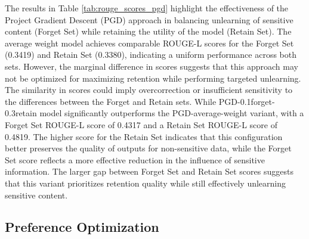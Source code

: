 \documentclass[11pt]{article}
\begin{document}
    \begin{table}[h!]
        \centering
        \caption{Average ROUGE-L Scores for Forget and Retain Sets}
        \label{tab:rouge_scores_pgd}
    \end{table}

    The results in Table \ref{tab:rouge_scores_pgd} highlight the effectiveness of the Project Gradient Descent (PGD) approach in balancing unlearning of sensitive content (Forget Set) while retaining the utility of the model (Retain Set). The average weight model achieves comparable ROUGE-L scores for the Forget Set (0.3419) and Retain Set (0.3380), indicating a uniform performance across both sets. However, the marginal difference in scores suggests that this approach may not be optimized for maximizing retention while performing targeted unlearning. The similarity in scores could imply overcorrection or insufficient sensitivity to the differences between the Forget and Retain sets. While PGD-0.1forget-0.3retain model significantly outperforms the PGD-average-weight variant, with a Forget Set ROUGE-L score of 0.4317 and a Retain Set ROUGE-L score of 0.4819. The higher score for the Retain Set indicates that this configuration better preserves the quality of outputs for non-sensitive data, while the Forget Set score reflects a more effective reduction in the influence of sensitive information. The larger gap between Forget Set and Retain Set scores suggests that this variant prioritizes retention quality while still effectively unlearning sensitive content.

    \subsection{Preference Optimization}
\end{document}
